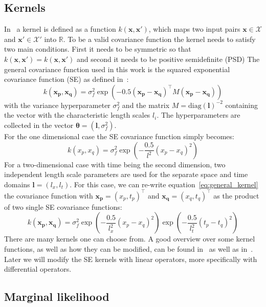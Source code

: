 \documentclass{article}
\begin{document}
\subsection{Kernels}
In~\cite{RasmussenCarlEdward} a kernel is defined as a function $k(\bm{x},\bm{x'})$, which maps two input pairs $\bm{x} \in \mathcal{X}$ and $\bm{x'} \in \mathcal{X'}$ into $\mathbb{R}$.
To be a valid covariance function the kernel needs to satisfy two main conditions. First it needs to be symmetric so that $k(\bm{x,x'}) = k(\bm{x,x'})$ and second it needs to be positive semidefinite (PSD)
The general covariance function used in this work is the squared exponential covariance function (SE) as defined in~\cite{RasmussenCarlEdward}:
\begin{equation}
    k(\bm{x_p}, \bm{x_q}) = \sigma_f^2  \exp({-0.5{(\bm{x_p}-\bm{x_q} )}^\intercal M (\bm{x_p}- \bm{x_q})})
\end{equation}
with the variance hyperparameter $\sigma_f^2$ and the matrix $M = {\mathrm{diag}(\bm{l})}^{-2}$ containing the vector with the characteristic length scales $l_i$. The hyperparameters are collected in the vector $\bm{\theta} = (\bm{l},\sigma_f^2)$. \\
For the one dimensional case the SE covariance function simply becomes:
\begin{equation}
    k(x_p, x_q) = \sigma_f^2  \exp\left({-\frac{0.5}{l^2} {(x_p-x_q)}^2}\right)
\end{equation}
For a two-dimensional case with time being the second dimension, two independent length scale parameters are used for the separate space and time domains $\bm{l} = (l_x,l_t)$. For this case, we can re-write equation~\ref{eq:general_kernel} the covariance function with $\bm{x_p} = {(x_p, t_p)}^\intercal$ and  $\bm{x_q} = {(x_q, t_q)}^\intercal$ as the product of two single SE covariance functions:
\begin{equation}
    k(\bm{x_p}, \bm{x_q}) = \sigma_f^2  \exp\left({-\frac{0.5}{l_x^2} {(x_p-x_q)}^2}\right) \exp\left({-\frac{0.5}{l_t^2} {(t_p-t_q)}^2}\right)
\end{equation}
There are many kernels one can choose from. A good overview over some kernel functions, as well as how they can be modified, can be found in~\cite{Duvenaud} as well as in~\cite{görtler2019a}. Later we will modify the SE kernels with linear operators, more specifically with differential operators.
\subsection{Marginal likelihood}
\end{document}
